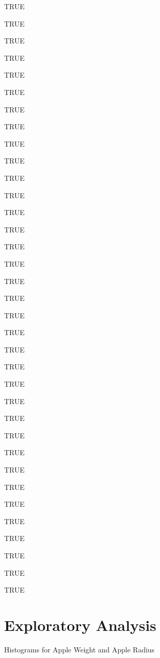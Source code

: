 \documentclass[11pt]{article}
\begin{document}
    \begin{enumerate*}
\item TRUE
\item TRUE
\item TRUE
\item TRUE
\item TRUE
\item TRUE
\item TRUE
\item TRUE
\item TRUE
\item TRUE
\item TRUE
\item TRUE
\item TRUE
\item TRUE
\item TRUE
\item TRUE
\item TRUE
\item TRUE
\item TRUE
\item TRUE
\item TRUE
\item TRUE
\item TRUE
\item TRUE
\item TRUE
\item TRUE
\item TRUE
\item TRUE
\item TRUE
\item TRUE
\item TRUE
\item TRUE
\item TRUE
\item TRUE
\item TRUE
\end{enumerate*}


    
    \hypertarget{exploratory-analysis}{%
\section{Exploratory Analysis}\label{exploratory-analysis}}

    Histograms for Apple Weight and Apple Radius
\end{document}
